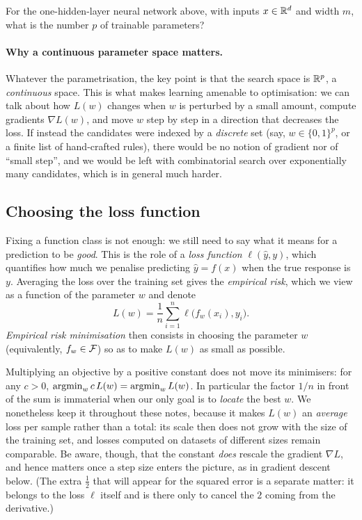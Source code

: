 \begin{exercise}[$\star$]
For the one-hidden-layer neural network above, with inputs $x \in \mathbb{R}^d$ and width $m$, what is the number $p$ of trainable parameters?
\end{exercise}

\paragraph{Why a continuous parameter space matters.}
Whatever the parametrisation, the key point is that the search space is $\mathbb{R}^p$, a \emph{continuous} space. This is what makes learning amenable to optimisation: we can talk about how $L(w)$ changes when $w$ is perturbed by a small amount, compute gradients $\nabla L(w)$, and move $w$ step by step in a direction that decreases the loss. If instead the candidates were indexed by a \emph{discrete} set (say, $w \in \{0, 1\}^p$, or a finite list of hand-crafted rules), there would be no notion of gradient nor of ``small step'', and we would be left with combinatorial search over exponentially many candidates, which is in general much harder.


\subsection{Choosing the loss function}

Fixing a function class is not enough: we still need to say what it means for a
prediction to be \emph{good}. This is the role of a \emph{loss function}
$\ell(\hat{y}, y)$, which quantifies how much we penalise predicting
$\hat{y} = f(x)$ when the true response is $y$. Averaging the loss over the
training set gives the \emph{empirical risk}, which we view as a function of the
parameter $w$ and denote
\[
L(w) = \frac{1}{n} \sum_{i=1}^n \ell\big( f_w(x_i), y_i \big).
\]
\emph{Empirical risk minimisation} then consists in choosing the parameter $w$
(equivalently, $f_w \in \mathcal{F}$) so as to make $L(w)$ as small as possible.

\begin{remark}
Multiplying an objective by a positive constant does not move its minimisers:
for any $c > 0$, $\operatorname*{argmin}_w c\, L(w) = \operatorname*{argmin}_w L(w)$.
In particular the factor $1/n$ in front of the sum is immaterial when our only
goal is to \emph{locate} the best $w$. We nonetheless keep it throughout these
notes, because it makes $L(w)$ an \emph{average} loss per sample rather than a
total: its scale then does not grow with the size of the training set, and losses
computed on datasets of different sizes remain comparable. Be aware, though, that
the constant \emph{does} rescale the gradient $\nabla L$, and hence matters once a
step size enters the picture, as in gradient descent below. (The extra $\tfrac12$
that will appear for the squared error is a separate matter: it belongs to the
loss $\ell$ itself and is there only to cancel the $2$ coming from the derivative.)
\end{remark}

